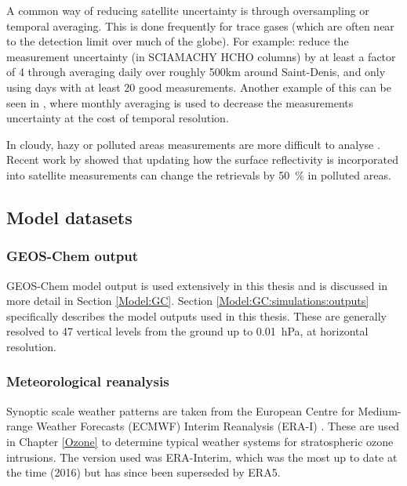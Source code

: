       
      A common way of reducing satellite uncertainty is through oversampling or temporal averaging.
      This is done frequently for trace gases (which are often near to the detection limit over much of the globe).
      For example: \textcite{Vigouroux2009} reduce the measurement uncertainty (in SCIAMACHY HCHO columns) by at least a factor of 4 through averaging daily over roughly 500km around Saint-Denis, and only using days with at least 20 good measurements.
      Another example of this can be seen in \textcite{Dufour2009}, where monthly averaging is used to decrease the measurements uncertainty at the cost of temporal resolution.
      
      In cloudy, hazy or polluted areas measurements are more difficult to analyse \parencite[e.g.,][]{Palmer2003,Marais2014}.
      Recent work by \textcite{Vasilkov2017} showed that updating how the surface reflectivity is incorporated into satellite measurements can change the retrievals by 50~\% in polluted areas.
      
      
  \subsection{Model datasets}
    
    \subsubsection{GEOS-Chem output}
      
      GEOS-Chem model output is used extensively in this thesis and is discussed in more detail in Section \ref{Model:GC}.
      Section \ref{Model:GC:simulations:outputs} specifically describes the model outputs used in this thesis.
      These are generally resolved to 47 vertical levels from the ground up to 0.01~hPa, at \lowhr horizontal resolution.
    
    \subsubsection{Meteorological reanalysis}
      \label{Model:datasets:ERAI}
      
      Synoptic scale weather patterns are taken from the European Centre for Medium-range Weather Forecasts (ECMWF) Interim Reanalysis (ERA-I) \parencite{Dee2011}.
      These are used in Chapter \ref{Ozone} to determine typical weather systems for stratospheric ozone intrusions.
      The version used was ERA-Interim, which was the most up to date at the time (2016) but has since been superseded by ERA5.
    
